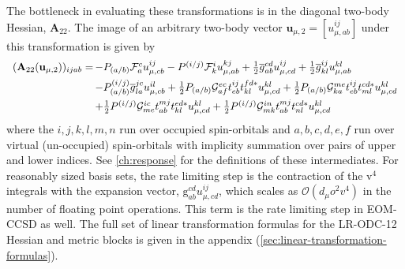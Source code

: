 The bottleneck in evaluating these transformations is in the diagonal two-body
Hessian, \(\mathbf{A}_{22}\).
The image of an arbitrary two-body vector
\(
    \mathbf{u}_{\mu,2}
    =
    [u_{\mu,ab}^{ij}]
\)
under this transformation is given by
\begin{equation}
    \label{eq:two-body-hessian-function-in-text}
    \begin{array}{r@{\,}l}
        (\mathbf{A}_{22}(\mathbf{u}_{\mu,2}))_{ijab}
        =
        &
        -
        P_{(a/b)}
        \mathcal{F}_a^c
        u_{\mu,cb}^{ij}
        -
        P^{(i/j)}
        \mathcal{F}_k^i
        u_{\mu,ab}^{kj}
        +
        \tfrac{1}{2}
        \overline{g}_{ab}^{cd}
        u_{\mu,cd}^{ij}
        +
        \tfrac{1}{2}
        \overline{g}_{kl}^{ij}
        u_{\mu,ab}^{kl}
        \\[5pt]
        &
        -
        P_{(a/b)}^{(i/j)}
        \overline{g}_{la}^{jc}
        u_{\mu,cb}^{il}
        +
        \tfrac{1}{2}
        P_{(a/b)}
        \mathcal{G}_{af}^{ec}
        t_{eb}^{ij}
        t_{kl}^{fd*}
        u_{\mu,cd}^{kl}
        +
        \tfrac{1}{2}
        P_{(a/b)}
        \mathcal{G}_{ka}^{me}
        t_{eb}^{ij}
        t_{ml}^{cd*}
        u_{\mu,cd}^{kl}
        \\[5pt]
        &
        +
        \tfrac{1}{2}
        P^{(i/j)}
        \mathcal{G}_{me}^{ic}
        t_{ab}^{mj}
        t_{kl}^{ed*}
        u_{\mu,cd}^{kl}
        +
        \tfrac{1}{2}
        P^{(i/j)}
        \mathcal{G}_{mk}^{in}
        t_{ab}^{mj}
        t_{nl}^{cd*}
        u_{\mu,cd}^{kl}
    \end{array}
\end{equation}
where the \(i,j,k,l,m,n\) run over occupied spin-orbitals and \(a,b,c,d,e,f\)
run over virtual (un-occupied) spin-orbitals with implicity summation over
pairs of upper and lower indices.
See \cref{ch:response} for the definitions of these intermediates.
For reasonably sized basis sets, the rate limiting step is the contraction of
the \(\mathrm{v}^4\) integrals with the expansion vector,
\(\mathrm{g}_{ab}^{cd}u_{\mu,cd}^{ij}\), which scales as
\(\mathcal{O}(d_\mu o^2v^4)\) in the number of floating point
operations.
This term is the rate limiting step in EOM-CCSD as well.
The full set of linear transformation formulas for the LR-ODC-12 Hessian and
metric blocks is given in the appendix
(\cref{sec:linear-transformation-formulas}).

